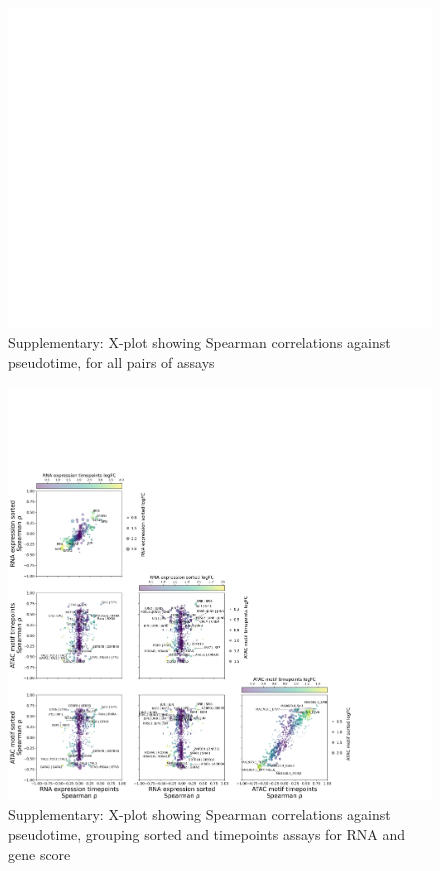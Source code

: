 \documentclass[a4paper]{article}
\begin{document}
\begin{figure}[!htb]
  \centering
  \includegraphics[width=\textwidth]{../figures/hematopoiesis/Myeloid DC_40_107_smooth_none_detailed_X_plot.png}
  \caption{Supplementary: X-plot showing Spearman correlations against pseudotime, for all pairs of assays}
\end{figure}

\begin{figure}[!htb]
  \centering
  \includegraphics[width=\textwidth]{../figures/hematopoiesis/Myeloid DC_40_107_smooth_none_semi_detailed_X_plot.png}
  \caption{Supplementary: X-plot showing Spearman correlations against pseudotime, grouping sorted and timepoints assays for RNA and gene score}
\end{figure}
\end{document}
